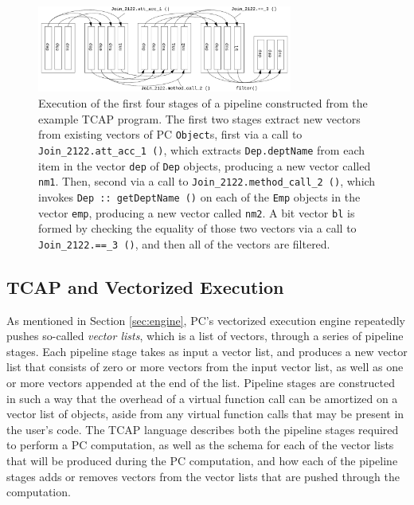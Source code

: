 \begin{figure}
  \begin{center}
    \includegraphics[width=3.3in]{TCAP}
  \end{center}
  \caption{Execution of the first four stages of a pipeline constructed from the example TCAP program.  The first two stages extract new vectors from 
existing vectors of PC \texttt{Object}s, first via a call to \texttt{Join\_2122.att\_acc\_1 ()}, which extracts \texttt{Dep.deptName} from each item in the vector
\texttt{dep} 
of \texttt{Dep} objects, producing a new vector called \texttt{nm1}. Then, second
via a call to \texttt{Join\_2122.method\_call\_2 ()}, which invokes \texttt{Dep :: getDeptName ()} on each of the \texttt{Emp} objects
in the vector \texttt{emp}, producing a new vector called \texttt{nm2}.  A bit vector \texttt{bl} is formed by checking the equality of those two 
vectors via a call to \texttt{Join\_2122.==\_3 ()}, and then all of the vectors are filtered.}
  \label{fig:TCAP}
\end{figure}


\subsection{TCAP and Vectorized Execution} \label{sec:vectorized}

As mentioned in Section \ref{sec:engine}, PC's vectorized execution engine repeatedly pushes 
so-called \emph{vector lists}, which is a list of vectors, through a series of pipeline stages.  Each pipeline stage
takes as input a vector list,
and produces a 
new vector list that consists of zero or more vectors from the input
vector list, as well as one or more vectors appended at the end of the list.
Pipeline stages are constructed in such a way that the overhead of a
virtual function call can be amortized on a vector list of objects,
aside from any virtual function calls that may be
present 
in the user's code.
The TCAP language describes both the pipeline stages required to perform a PC computation, as well as the schema for each of the vector lists that
will be produced during the PC computation, and how each of the pipeline stages adds or removes vectors from the vector lists that are pushed through
the computation.

